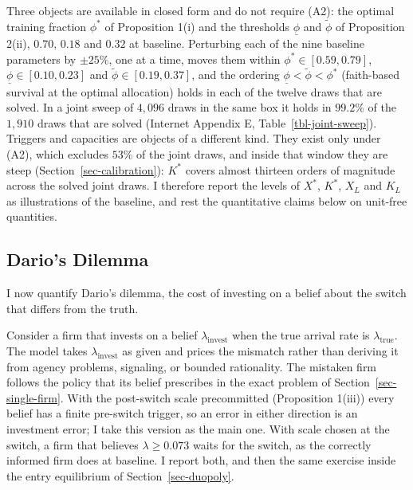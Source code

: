 \documentclass[
  11pt,
  letterpaper,
]{scrartcl}
\begin{document}
Three objects are available in closed form and do not require (A2): the
optimal training fraction \(\phi^*\) of Proposition 1(i) and the
thresholds \(\underline{\phi}\) and \(\tilde{\phi}\) of Proposition
2(ii), \(0.70\), \(0.18\) and \(0.32\) at baseline. Perturbing each of
the nine baseline parameters by \(\pm 25\%\), one at a time, moves them
within \(\phi^* \in [0.59, 0.79]\),
\(\underline{\phi} \in [0.10, 0.23]\) and
\(\tilde{\phi} \in [0.19, 0.37]\), and the ordering
\(\underline{\phi} < \tilde{\phi} < \phi^*\) (faith-based survival at
the optimal allocation) holds in each of the twelve draws that are
solved. In a joint sweep of \(4{,}096\) draws in the same box it holds
in \(99.2\%\) of the \(1{,}910\) draws that are solved (Internet
Appendix E, Table~\ref{tbl-joint-sweep}). Triggers and capacities are
objects of a different kind. They exist only under (A2), which excludes
\(53\%\) of the joint draws, and inside that window they are steep
(Section~\ref{sec-calibration}): \(K^*\) covers almost thirteen orders
of magnitude across the solved joint draws. I therefore report the
levels of \(X^*\), \(K^*\), \(X_L\) and \(K_L\) as illustrations of the
baseline, and rest the quantitative claims below on unit-free
quantities.

\subsection{Dario's Dilemma}\label{darios-dilemma}

I now quantify Dario's dilemma, the cost of investing on a belief about
the switch that differs from the truth.

Consider a firm that invests on a belief \(\lambda_{\text{invest}}\)
when the true arrival rate is \(\lambda_{\text{true}}\). The model takes
\(\lambda_{\text{invest}}\) as given and prices the mismatch rather than
deriving it from agency problems, signaling, or bounded rationality. The
mistaken firm follows the policy that its belief prescribes in the exact
problem of Section~\ref{sec-single-firm}. With the post-switch scale
precommitted (Proposition 1(iii)) every belief has a finite pre-switch
trigger, so an error in either direction is an investment error; I take
this version as the main one. With scale chosen at the switch, a firm
that believes \(\lambda \geq 0.073\) waits for the switch, as the
correctly informed firm does at baseline. I report both, and then the
same exercise inside the entry equilibrium of Section~\ref{sec-duopoly}.
\end{document}
